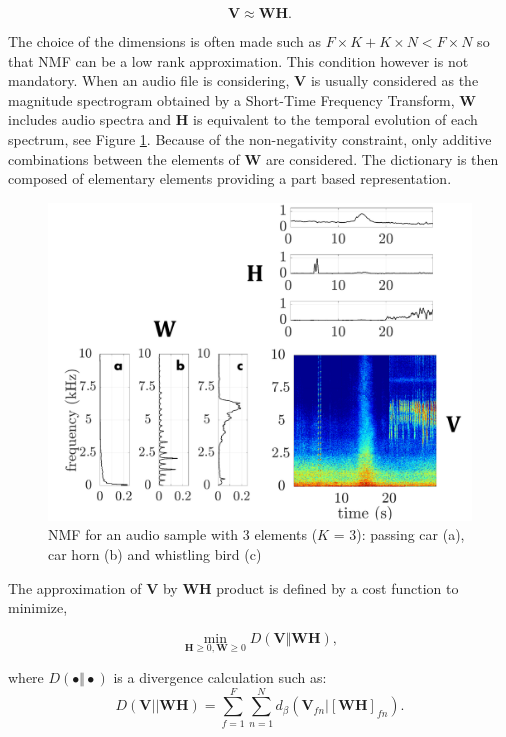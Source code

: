 \documentclass[review,5p,twocolumn,sort&compress,times]{elsarticle}
\begin{document}
\begin{equation}\label{eq:nmf}
\mathbf{V} \approx \mathbf{WH}.
\end{equation}

The choice of the dimensions is often made such as $F\times K + K \times N < F \times N$ so that NMF can be a low rank approximation. This condition however is not mandatory. When an audio file is considering, $\mathbf{V}$ is usually considered as the magnitude spectrogram obtained by a Short-Time Frequency Transform, $\mathbf{W}$ includes audio spectra and $\mathbf{H}$ is equivalent to the temporal evolution of each spectrum, see Figure \ref{fig:exampleNMF}. Because of the non-negativity constraint, only additive combinations between the elements of $\mathbf{W}$ are considered. The dictionary is then composed of elementary elements providing a part based representation.  

\begin{figure}[t]
\includegraphics[width=.9\linewidth]{./figures/schema_introduction_nmf.pdf} 
\caption{NMF for an audio sample with 3 elements ($K$ = 3): passing car (a), car horn (b) and whistling bird (c)}
\label{fig:exampleNMF}
\end{figure}

The approximation of $\mathbf{V}$ by $\mathbf{WH}$ product is defined by a cost function to minimize, 

\begin{equation}\label{eq:min-D-WH}
\underset{\mathbf{H} \geq 0, \mathbf{W} \geq 0}{\min} D\left(\mathbf{V} \Vert \mathbf{WH}\right), 
\end{equation}

where $D(\bullet \Vert \bullet)$ is a divergence calculation such as:
\begin{equation}
D\left(\textbf{V} \vert\vert \mathbf{WH} \right) = \sum_{f = 1}^{F} \sum_{n = 1}^{N} d_{\beta}
\left(\textbf{V}_{fn} \vert \left[ \textbf{WH} \right]_{fn} \right).
\end{equation}
\end{document}
